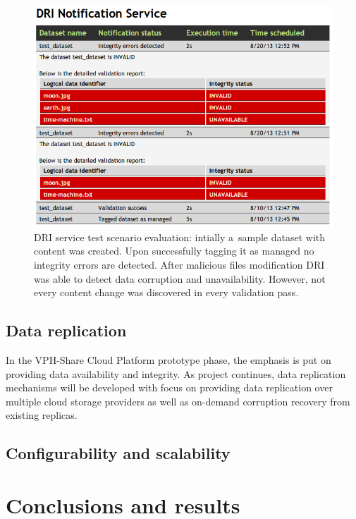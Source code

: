 \begin{figure}[h!]
	\centering
	\includegraphics[width=\textwidth]{images/test-scenario-results.png}
	\caption{DRI service test scenario evaluation: intially a~sample dataset with content
	was created. Upon successfully tagging it as managed no integrity errors are detected.
	After malicious files modification DRI was able to detect data corruption and unavailability.
	However, not every content change was discovered in every validation pass.}
	\label{fig:test-scenario-results}
\end{figure}


\subsection{Data replication}
In the VPH-Share Cloud Platform prototype phase, the emphasis is put on providing data
availability and integrity. As project continues, data replication mechanisms will be developed
with focus on providing data replication over multiple cloud storage providers as well as on-demand
corruption recovery from existing replicas.

\subsection{Configurability and scalability}


\section{Conclusions and results}
